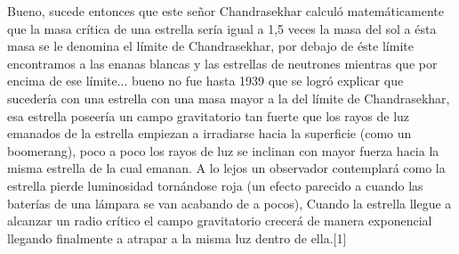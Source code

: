 \documentclass[12pt]{article}
\begin{document}
Bueno, sucede entonces que este señor Chandrasekhar calculó matemáticamente que la masa crítica de una estrella sería igual a 1,5 veces la masa del sol a ésta masa se le denomina el límite de Chandrasekhar, por debajo de éste límite encontramos a las enanas blancas y las estrellas de neutrones mientras que por encima de ese límite... bueno no fue hasta 1939 que se logró explicar que sucedería con una estrella con una masa mayor a la del límite de Chandrasekhar, esa estrella poseería un campo gravitatorio tan fuerte que los rayos de luz emanados de la estrella empiezan a irradiarse hacia la superficie (como un boomerang), poco a poco los rayos de luz se inclinan con mayor fuerza hacia la misma estrella de la cual emanan. A lo lejos un observador contemplará como la estrella pierde luminosidad tornándose roja (un efecto parecido a cuando las baterías de una lámpara se van acabando de a pocos), Cuando la estrella llegue a alcanzar un radio crítico el campo gravitatorio crecerá de manera exponencial llegando finalmente a atrapar a la misma luz dentro de ella.[1]
\\\\%
\end{document}
